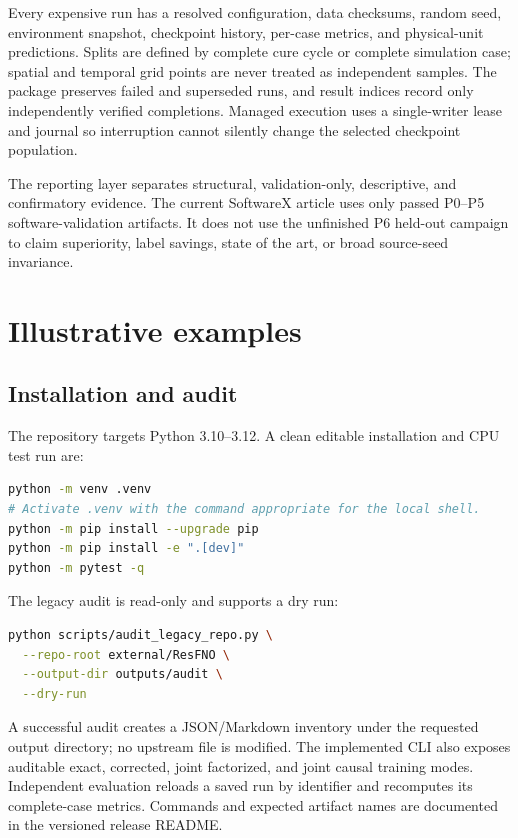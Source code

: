 \documentclass[preprint,12pt]{elsarticle}
\begin{document}
Every expensive run has a resolved configuration, data checksums, random seed,
environment snapshot, checkpoint history, per-case metrics, and physical-unit
predictions. Splits are defined by complete cure cycle or complete simulation
case; spatial and temporal grid points are never treated as independent
samples. The package preserves failed and superseded runs, and result indices
record only independently verified completions. Managed execution uses a
single-writer lease and journal so interruption cannot silently change the
selected checkpoint population.

The reporting layer separates structural, validation-only, descriptive, and
confirmatory evidence. The current SoftwareX article uses only passed P0--P5
software-validation artifacts. It does not use the unfinished P6 held-out
campaign to claim superiority, label savings, state of the art, or broad
source-seed invariance.

\section{Illustrative examples}

\subsection{Installation and audit}

The repository targets Python 3.10--3.12. A clean editable installation and
CPU test run are:

\begin{lstlisting}[language=bash]
python -m venv .venv
# Activate .venv with the command appropriate for the local shell.
python -m pip install --upgrade pip
python -m pip install -e ".[dev]"
python -m pytest -q
\end{lstlisting}

The legacy audit is read-only and supports a dry run:

\begin{lstlisting}[language=bash]
python scripts/audit_legacy_repo.py \
  --repo-root external/ResFNO \
  --output-dir outputs/audit \
  --dry-run
\end{lstlisting}

A successful audit creates a JSON/Markdown inventory under the requested
output directory; no upstream file is modified. The implemented CLI also
exposes auditable exact, corrected, joint factorized, and joint causal training
modes. Independent evaluation reloads a saved run by identifier and recomputes
its complete-case metrics. Commands and expected artifact names are documented
in the versioned release README.
\end{document}
